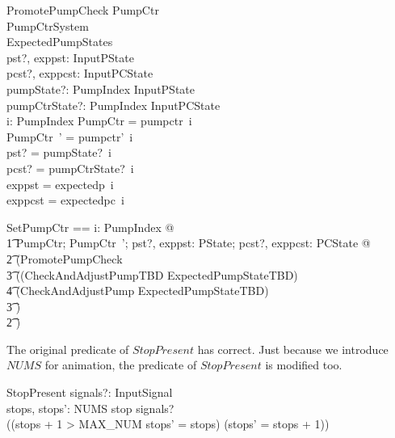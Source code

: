 \documentclass{report} %
\begin{document}
\begin{schema}{PromotePumpCheck}
  \Delta PumpCtr \\ %
  \Delta PumpCtrSystem \\ %
  ExpectedPumpStates \\ %
  pst?, exppst: InputPState \\ %
  pcst?, exppcst: InputPCState \\ %
  pumpState?: PumpIndex \fun InputPState \\ %
  pumpCtrState?: PumpIndex \fun InputPCState \\ %
  i: PumpIndex
  \where %
  \theta PumpCtr = pumpctr~i \\ %
  \theta PumpCtr~' = pumpctr'~i \\ %
  pst? = pumpState?~i \\ %
  pcst? = pumpCtrState?~i \\ %
  exppst = expectedp~i \\ %
  exppcst = expectedpc~i
\end{schema}

\begin{zed}
  SetPumpCtr == \forall i: PumpIndex @ \\
    \t1 \exists PumpCtr; PumpCtr~'; pst?, exppst: PState; pcst?, exppcst: PCState  @ \\
    \t2 (PromotePumpCheck \land \\
        \t3 ((CheckAndAdjustPumpTBD \land ExpectedPumpStateTBD) \lor \\
        \t4 (CheckAndAdjustPump \land \lnot ExpectedPumpStateTBD)\\
        \t3 )\\
    \t2 )
\end{zed}

The original predicate of $StopPresent$ has correct. Just because we introduce $NUMS$ for animation, the predicate of $StopPresent$ is modified too. 
\begin{schema}{StopPresent}
  signals?: \power InputSignal \\ %
  stops, stops': NUMS
  \where %
  stop \in signals?  \\ %
  ((stops + 1 > MAX\_NUM \land stops' = stops) \lor (stops' = stops + 1))
\end{schema}
\end{document}
